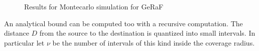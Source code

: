 \documentclass[10pt]{article}
\begin{document}
\begin{figure}[h!]
  \centering
  \caption{Results for Montecarlo simulation for GeRaF}
  \label{fig:geraf1}
\end{figure}

An analytical bound can be computed too with a recursive computation. The distance $D$ from the source to the destination is quantized into small intervals. In particular let $\nu$ be the number of intervals of this kind inside the coverage radius. 
\end{document}
